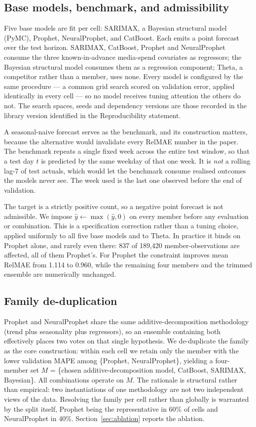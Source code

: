 \documentclass[11pt]{article}
\begin{document}
\subsection{Base models, benchmark, and admissibility}
\label{sec:models}

Five base models are fit per cell: SARIMAX, a Bayesian structural model (PyMC), Prophet, NeuralProphet, and CatBoost. Each emits a point forecast over the test horizon. SARIMAX, CatBoost, Prophet and NeuralProphet consume the three known-in-advance media-spend covariates as regressors; the Bayesian structural model consumes them as a regression component; Theta, a competitor rather than a member, uses none. Every model is configured by the same procedure --- a common grid search scored on validation error, applied identically in every cell --- so no model receives tuning attention the others do not. The search spaces, seeds and dependency versions are those recorded in the library version identified in the Reproducibility statement.

A seasonal-naive forecast serves as the benchmark, and its construction matters, because the alternative would invalidate every RelMAE number in the paper. The benchmark repeats a single fixed week across the entire test window, so that a test day $t$ is predicted by the same weekday of that one week. It is \emph{not} a rolling lag-7 of test actuals, which would let the benchmark consume realised outcomes the models never see. The week used is the last one observed before the end of validation.

The target is a strictly positive count, so a negative point forecast is not admissible. We impose $\hat{y} \leftarrow \max(\hat{y}, 0)$ on every member before any evaluation or combination. This is a specification correction rather than a tuning choice, applied uniformly to all five base models and to Theta. In practice it binds on Prophet alone, and rarely even there: 837 of 189,420 member-observations are affected, all of them Prophet's. For Prophet the constraint improves mean RelMAE from 1.114 to 0.960, while the remaining four members and the trimmed ensemble are numerically unchanged.

\subsection{Family de-duplication}
\label{sec:dedup}

Prophet and NeuralProphet share the same additive-decomposition methodology (trend plus seasonality plus regressors), so an ensemble containing both effectively places two votes on that single hypothesis. We de-duplicate the family as the core construction: within each cell we retain only the member with the lower validation MAPE among \{Prophet, NeuralProphet\}, yielding a four-member set $M$ = \{chosen additive-decomposition model, CatBoost, SARIMAX, Bayesian\}. All combinations operate on $M$. The rationale is structural rather than empirical: two instantiations of one methodology are not two independent views of the data. Resolving the family per cell rather than globally is warranted by the split itself, Prophet being the representative in 60\% of cells and NeuralProphet in 40\%. Section~\ref{sec:ablation} reports the ablation.
\end{document}
